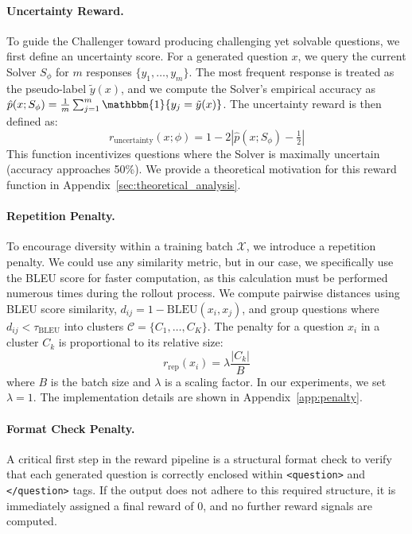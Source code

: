 \paragraph{Uncertainty Reward.}
To guide the Challenger toward producing challenging yet solvable questions, we first define an uncertainty score. For a generated question $x$, we query the current Solver $S_{\phi}$ for $m$ responses $\{y_1, \dots, y_m\}$. The most frequent response is treated as the pseudo-label $\tilde{y}(x)$, and we compute the Solver’s empirical accuracy as $\hat{p}(x; S_{\phi}) = \frac{1}{m} \sum_{j=1}^{m} \mathbbm{1}\{y_j = \tilde{y}(x)\}$. The uncertainty reward is then defined as:
\[
r_{\text{uncertainty}}(x; \phi) = 1 - 2\left| \hat{p}(x; S_{\phi}) - \tfrac{1}{2} \right|
\]
This function incentivizes questions where the Solver is maximally uncertain (accuracy approaches 50\%). We provide a theoretical motivation for this reward function in Appendix~\ref{sec:theoretical_analysis}.

\paragraph{Repetition Penalty.}
To encourage diversity within a training batch $\mathcal{X}$, we introduce a repetition penalty. 
We could use any similarity metric, but in our case, we specifically use the BLEU score for faster computation, as this calculation must be performed numerous times during the rollout process.
We compute pairwise distances using BLEU score similarity, $d_{ij} = 1 - \text{BLEU}(x_i, x_j)$, and group questions where $d_{ij} < \tau_{\text{BLEU}}$ into clusters $\mathcal{C} = \{C_1, \dots, C_K\}$. The penalty for a question $x_i$ in a cluster $C_k$ is proportional to its relative size:
\[
r_{\text{rep}}(x_i) = \lambda \frac{|C_k|}{B}
\]
where $B$ is the batch size and $\lambda$ is a scaling factor. In our experiments, we set $\lambda=1$. The implementation details are shown in Appendix~\ref{app:penalty}.

\paragraph{Format Check Penalty.}
A critical first step in the reward pipeline is a structural format check to verify that each generated question is correctly enclosed within \texttt{<question>} and \texttt{</question>} tags. If the output does not adhere to this required structure, it is immediately assigned a final reward of $0$, and no further reward signals are computed.


